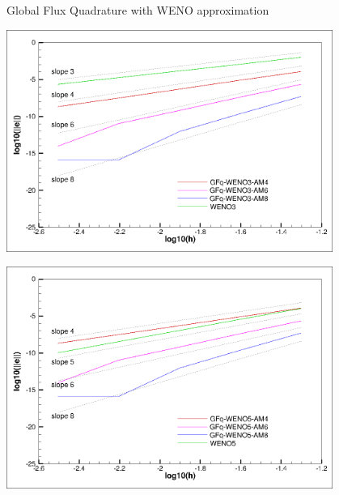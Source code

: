 \begin{frame}[t]{Global Flux Quadrature  with WENO approximation}
{\begin{minipage}{0.5\textwidth}
\centering\includegraphics[width=0.8\textwidth]{figs/WENO-FD/figures/Burgers/convergence_steady/convburg-weno3} 
\end{minipage}\hfill
\begin{minipage}{0.5\textwidth}
\centering\includegraphics[width=0.8\textwidth]{figs/WENO-FD/figures/Burgers/convergence_steady/convburg-weno5}
\end{minipage}
} 

\end{frame}
